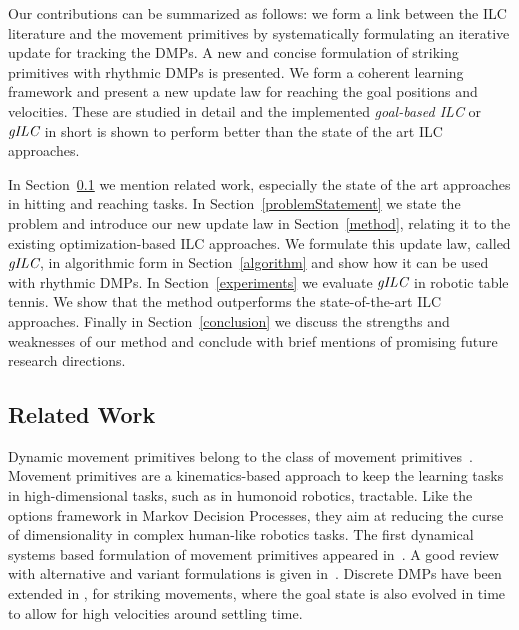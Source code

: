 Our contributions can be summarized as follows: we form a link between the ILC literature and the movement primitives by systematically formulating an iterative update for tracking the DMPs. A new and concise formulation of striking primitives with rhythmic DMPs is presented. We form a coherent learning framework and present a new update law for reaching the goal positions and velocities. These are studied in detail and the implemented \emph{goal-based ILC} or $\emph{gILC}$ in short is shown to perform better than the state of the art ILC approaches.

In Section~\ref{relatedWork} we mention related work, especially the state of the art approaches in hitting and reaching tasks. In Section~\ref{problemStatement} we state the problem and introduce our new update law in Section~\ref{method}, relating it to the existing optimization-based ILC approaches. We formulate this update law, called $\emph{gILC}$, in algorithmic form in Section~\ref{algorithm} and show how it can be used with rhythmic DMPs. In Section~\ref{experiments} we evaluate $\emph{gILC}$ in robotic table tennis. We show that the method outperforms the state-of-the-art ILC approaches. Finally in Section~\ref{conclusion} we discuss the strengths and weaknesses of our method and conclude with brief mentions of promising future research directions.

\subsection{Related Work}\label{relatedWork}

Dynamic movement primitives belong to the class of movement primitives~\cite{Flash85}. Movement primitives are a kinematics-based approach to keep the learning tasks in high-dimensional tasks, such as in humonoid robotics, tractable. Like the options framework in Markov Decision Processes, they aim at reducing the curse of dimensionality in complex human-like robotics tasks. The first dynamical systems based formulation of movement primitives appeared in~\cite{Ijspeert02}. A good review with alternative and variant formulations is given in~\cite{Ijspeert13}. Discrete DMPs have been extended in \cite{Kober10}, \cite{Muelling13} for striking movements, where the goal state is also evolved in time to allow for high velocities around settling time.


